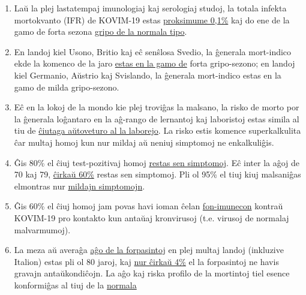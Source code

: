 \begin{enumerate}
\def\labelenumi{\arabic{enumi}.}
\tightlist
\item
  Laŭ la plej lastatempaj imunologiaj kaj serologiaj studoj, la totala
  infekta mortokvanto (IFR) de KOVIM-19 estas
  \href{https://swprs.org/studies-on-covid-19-lethality/}{proksimume
  0,1\%} kaj do ene de la gamo de forta sezona
  \href{https://www.ebm-netzwerk.de/en/publications/covid-19}{gripo de
  la normala tipo}.
\item
  En landoj kiel Usono, Britio kaj eĉ senŝlosa Svedio, la ĝenerala
  mort-indico ekde la komenco de la jaro
  \href{https://swprs.org/studies-on-covid-19-lethality/\#overall-mortality}{estas
  en la gamo de} forta gripo-sezono; en landoj kiel Germanio, Aŭstrio
  kaj Svislando, la ĝenerala mort-indico estas en la gamo de milda
  gripo-sezono.
\item
  Eĉ en la lokoj de la mondo kie plej troviĝas la malsano, la risko de
  morto por la ĝenerala loĝantaro en la aĝ-rango de lernantoj kaj
  laboristoj estas simila al tiu de
  \href{https://www.medrxiv.org/content/10.1101/2020.04.05.20054361v1}{ĉiutaga
  aŭtoveturo al la laborejo}. La risko estis komence superkalkulita ĉar
  multaj homoj kun nur mildaj aŭ neniuj simptomoj ne enkalkuliĝis.
\item
  Ĝis 80\% el ĉiuj test-pozitivaj homoj
  \href{https://www.bmj.com/content/369/bmj.m1375}{restas sen
  simptomoj}. Eĉ inter la aĝoj de 70 kaj 79,
  \href{https://www.niid.go.jp/niid/en/2019-ncov-e/9407-covid-dp-fe-01.html}{ĉirkaŭ
  60\%} restas sen simptomoj. Pli ol 95\% el tiuj kiuj malsaniĝas
  elmontras nur
  \href{https://swprs.org/studies-on-covid-19-lethality/\#hospitalizations}{mildajn
  simptomojn}.
\item
  Ĝis 60\% el ĉiuj homoj jam povas havi ioman ĉelan
  \href{https://www.cell.com/cell/fulltext/S0092-8674(20)30610-3}{fon-imunecon}
  kontraŭ KOVIM-19 pro kontakto kun antaŭaj kronvirusoj (t.e. virusoj de
  normalaj malvarmumoj).
\item
  La meza aŭ averaĝa
  \href{https://swprs.org/studies-on-covid-19-lethality/\#age}{aĝo de la
  forpasintoj} en plej multaj landoj (inkluzive Italion) estas pli ol 80
  jaroj, kaj
  \href{https://www.bloomberg.com/news/articles/2020-05-26/italy-says-96-of-virus-fatalities-suffered-from-other-illnesses}{nur
  ĉirkaŭ 4\%} el la forpasintoj ne havis gravajn antaŭkondiĉojn. La aĝo
  kaj riska profilo de la mortintoj tiel esence konformiĝas al tiuj de
  la
  \href{https://www.vienna.at/analyse-zeigt-covid-19-opferkurve-entspricht-normaler-mortalitaet/6581246}{normala
}
\end{enumerate}

